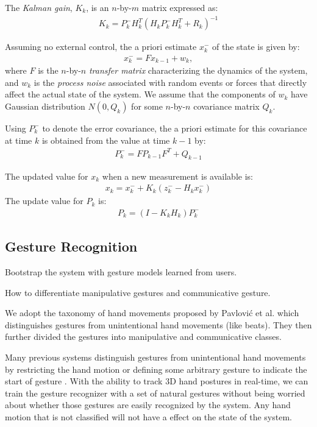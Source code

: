 The \textit{Kalman gain}, $K_k$, is an $n$-by-$m$ matrix expressed as:
\begin{align*}
K_k = P_k^-H_k^T(H_kP_k^-H_k^T + R_k)^{-1}
\end{align*}

Assuming no external control, the a priori estimate $x_k^-$ of the state is
given by:
\begin{align*}
x_k^- = Fx_{k - 1} + w_k,
\end{align*}
where $F$ is the $n$-by-$n$ \textit{transfer matrix} characterizing the
dynamics of the system, and $w_k$ is the \textit{process noise} associated with
random events or forces that directly affect the actual state of the system. We assume that the components of $w_k$
have Gaussian distribution $N(0, Q_k)$ for some $n$-by-$n$ covariance matrix
$Q_k$.

Using $P_k^-$ to denote the error covariance, the a priori estimate for this
covariance at time $k$ is obtained from the value at time $k - 1$ by:
\begin{align*}
P_k^- = FP_{k - 1}F^T + Q_{k - 1}
\end{align*}

The updated value for $x_k$ when a new measurement is available is:
\begin{align*}
x_k = x_k^- + K_k(z_k^- - H_kx_k^-)
\end{align*}
The update value for $P_k$ is:
\begin{align*}
P_k = (I - K_kH_k)P_k^-
\end{align*}
   
\subsection{Gesture Recognition}
Bootstrap the system with gesture models learned from users.

How to differentiate manipulative gestures and communicative gesture.

We adopt the taxonomy of hand movements proposed by Pavlovi\'{c} et al. \cite{Pavlovic97} which distinguishes gestures from unintentional hand movements (like beats). They then further divided the gestures into manipulative and communicative classes. 

Many previous systems distinguish gestures from unintentional hand movements by restricting the hand motion or defining some arbitrary gesture to indicate the start of gesture \cite{Shin04}. With the ability to track 3D hand postures in real-time, we can train the gesture recognizer with a set of natural gestures without being worried about whether those gestures are easily recognized by the system. Any hand motion that is not classified will not have a effect on the state of the system.

